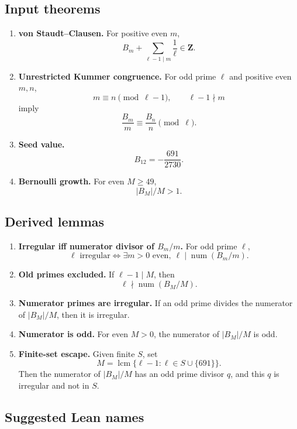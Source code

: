 \documentclass[11pt]{article}
\newcommand{\Z}{\mathbf Z}
\newcommand{\num}{\operatorname{num}}
\newcommand{\lcm}{\operatorname{lcm}}
\begin{document}
\subsection*{Input theorems}

\begin{enumerate}[label=\textbf{Input \arabic*.}]
\item \textbf{von Staudt--Clausen.}
For positive even $m$,
\[
  B_m+\sum_{\ell-1\mid m}\frac1\ell\in\Z.
\]

\item \textbf{Unrestricted Kummer congruence.}
For odd prime $\ell$ and positive even $m,n$,
\[
  m\equiv n\pmod{\ell-1},\qquad \ell-1\nmid m
\]
imply
\[
  \frac{B_m}{m}\equiv\frac{B_n}{n}\pmod\ell.
\]

\item \textbf{Seed value.}
\[
  B_{12}=-\frac{691}{2730}.
\]

\item \textbf{Bernoulli growth.}
For even $M\ge49$,
\[
  |B_M|/M>1.
\]
\end{enumerate}

\subsection*{Derived lemmas}

\begin{enumerate}[label=\textbf{Derived \arabic*.}]
\item \textbf{Irregular iff numerator divisor of $B_m/m$.}
For odd prime $\ell$,
\[
  \ell\text{ irregular}
  \iff
  \exists m>0\text{ even},\ \ell\mid\num(B_m/m).
\]

\item \textbf{Old primes excluded.}
If $\ell-1\mid M$, then
\[
  \ell\nmid\num(B_M/M).
\]

\item \textbf{Numerator primes are irregular.}
If an odd prime divides the numerator of $|B_M|/M$, then it is irregular.

\item \textbf{Numerator is odd.}
For even $M>0$, the numerator of $|B_M|/M$ is odd.

\item \textbf{Finite-set escape.}
Given finite $S$, set
\[
  M=\lcm\{\ell-1:\ell\in S\cup\{691\}\}.
\]
Then the numerator of $|B_M|/M$ has an odd prime divisor $q$, and this $q$ is irregular and not in $S$.
\end{enumerate}

\subsection*{Suggested Lean names}
\end{document}
